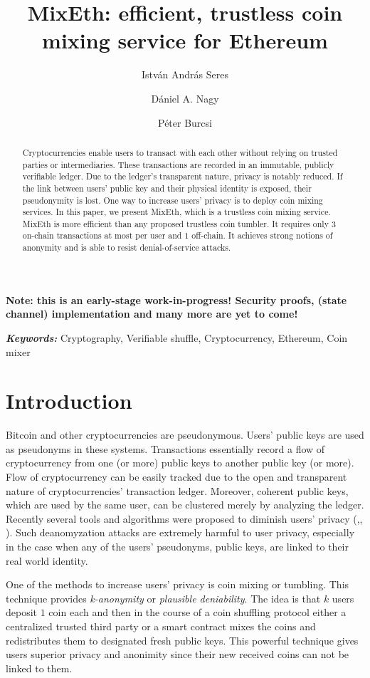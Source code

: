 \documentclass[a4paper]{article}
\title{MixEth: efficient, trustless coin mixing service for Ethereum}
\author[1]{István András Seres}
\author[1]{Dániel A. Nagy}
\author[1]{Péter Burcsi}
\affil[1]{Department of Computer Algebra, Eötvös Loránd University}
\theoremstyle{definition}
\providecommand{\keywords}[1]{\textbf{\textit{Keywords:}} #1}
\begin{document}
\maketitle


\textbf{Note: this is an early-stage work-in-progress! Security proofs, (state channel) implementation and many more are yet to come!} 
\begin{abstract}
Cryptocurrencies enable users to transact with each other without relying on trusted parties or intermediaries. These transactions are recorded in an immutable, publicly verifiable ledger. Due to the ledger's transparent nature, privacy is notably reduced. If the link between users' public key and their physical identity is exposed, their pseudonymity is lost. One way to increase users' privacy is to deploy coin mixing services. In this paper, we present MixEth, which is a trustless coin mixing service. MixEth is more efficient than any proposed trustless coin tumbler. It requires only $3$ on-chain transactions at most per user and $1$ off-chain. It achieves strong notions of anonymity and is able to resist denial-of-service attacks.      
\end{abstract}
\keywords{Cryptography, Verifiable shuffle, Cryptocurrency, Ethereum, Coin mixer}

\section{Introduction}
Bitcoin \cite{nakamoto2008bitcoin} and other cryptocurrencies are pseudonymous. Users' public keys are used as pseudonyms in these systems. Transactions essentially record a flow of cryptocurrency from one (or more) public keys to another public key (or more). Flow of cryptocurrency can be easily tracked due to the open and transparent nature of cryptocurrencies' transaction ledger. Moreover, coherent public keys, which are used by the same user, can be clustered merely by analyzing the ledger. Recently several tools and algorithms were proposed to diminish users' privacy (\cite{meiklejohn2013fistful},\cite{moser2013inquiry}, \cite{moreno2016listening}). Such deanomyzation attacks are extremely harmful to user privacy, especially in the case when any of the users' pseudonyms, public keys, are linked to their real world identity. 

One of the methods to increase users' privacy is coin mixing or tumbling. This technique provides \textit{k-anonymity} or \textit{plausible deniability}. The idea is that $k$ users deposit $1$ coin each and then in the course of a coin shuffling protocol either a centralized trusted third party or a smart contract mixes the coins and redistributes them to designated fresh public keys. This powerful technique gives users superior privacy and anonimity since their new received coins can not be linked to them.
\end{document}
